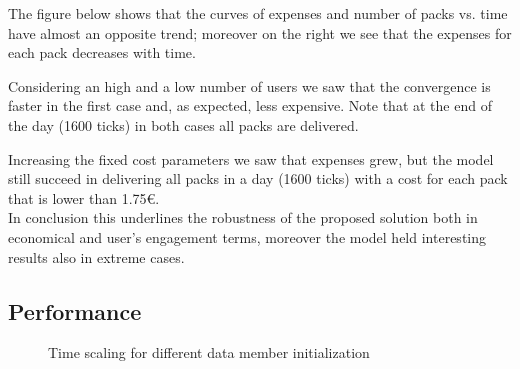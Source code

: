 \documentclass[11pt,a4paper]{article}
\begin{document}
The figure below shows that the curves of expenses and number of packs vs. time have almost an opposite trend; moreover on the right we see that the expenses for each pack decreases with time.

\newpage
Considering an high and a low number of users we saw that the convergence is faster in the first case and, as expected, less expensive. Note that at the end of the day (1600 ticks) in both cases all packs are delivered.


Increasing the fixed cost parameters we saw that expenses grew, but the model still succeed in delivering all packs in a day (1600 ticks) with a cost for each pack that is lower than 1.75\euro{}.
\\
In conclusion this underlines the robustness of the proposed solution both in economical and user's engagement terms, moreover the model held interesting results also in extreme cases.

\subsection*{Performance}
\begin{figure}[h!]
  \centering
  \caption{Time scaling for different data member initialization}

\end{figure}
\end{document}
